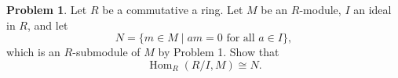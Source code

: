 \documentclass[11pt]{article}
\DeclareMathOperator{\Hom}{Hom}
\theoremstyle{definition}
\newtheorem{problem}{Problem}
\begin{document}
\begin{problem}
Let $R$ be a commutative a ring.
Let $M$ be an $R$-module, $I$ an ideal in $R$, and let
$$N = \{ m \in M \mid am = 0 \textrm{ for all } a \in I \},$$
which is an $R$-submodule of $M$ by Problem 1. Show that
$$\Hom_R(R/I,M) \cong N.$$
\end{problem}


\end{document}

